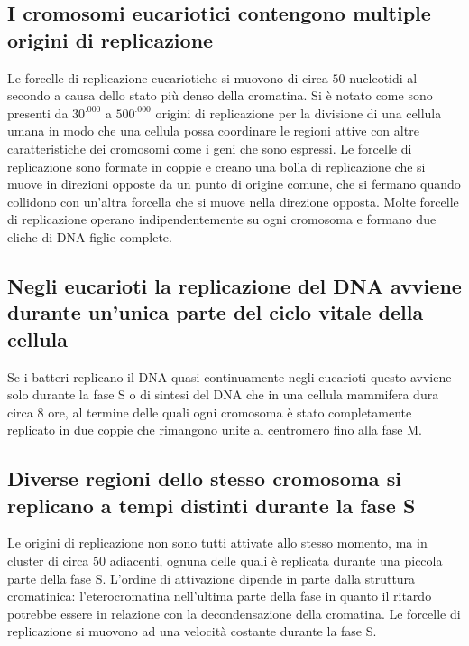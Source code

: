 \subsection{I cromosomi eucariotici contengono multiple origini di replicazione}
Le forcelle di replicazione eucariotiche si muovono di circa $50$ nucleotidi al secondo a causa dello stato pi\`u denso della cromatina. Si \`e notato come sono presenti da $30^.000$ a 
$500^.000$ origini di replicazione per la divisione di una cellula umana in modo che una cellula possa coordinare le regioni attive con altre caratteristiche dei cromosomi come i geni
che sono espressi. Le forcelle di replicazione sono formate in coppie e creano una bolla di replicazione che si muove in  direzioni opposte da un punto di origine comune, che si
fermano quando collidono con un'altra forcella che si muove nella direzione opposta. Molte forcelle di replicazione operano indipendentemente su ogni cromosoma e formano due eliche di 
DNA figlie complete. 
\subsection{Negli eucarioti la replicazione del DNA avviene durante un'unica parte del ciclo vitale della cellula}
Se i batteri replicano il DNA quasi continuamente negli eucarioti questo avviene solo durante la fase S o di sintesi del DNA che in una cellula mammifera dura circa $8$ ore, al termine
delle quali ogni cromosoma \`e stato completamente replicato in due coppie che rimangono unite al centromero fino alla fase M. 
\subsection{Diverse regioni dello stesso cromosoma si replicano a tempi distinti durante la fase S}
Le origini di replicazione non sono tutti attivate allo stesso momento, ma in cluster di circa $50$ adiacenti, ognuna delle quali \`e replicata durante una piccola parte della fase S.
L'ordine di attivazione dipende in parte dalla struttura cromatinica: l'eterocromatina nell'ultima parte della fase in quanto il ritardo potrebbe essere in relazione con la 
decondensazione della cromatina. Le forcelle di replicazione si muovono ad una velocit\`a costante durante la fase S.
